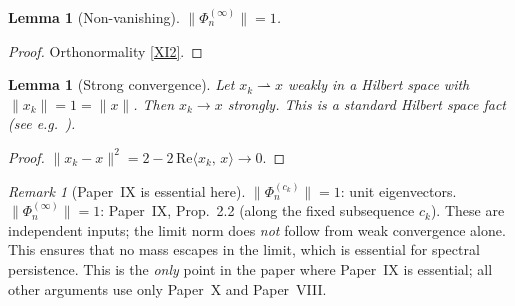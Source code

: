 \documentclass[12pt,a4paper]{amsart}
\newtheorem{lemma}[theorem]{Lemma}
\theoremstyle{definition}
\theoremstyle{remark}
\newtheorem{remark}[theorem]{Remark}
\newcommand{\ip}[2]{\langle #1,\, #2\rangle}
\begin{document}
\begin{lemma}[Non-vanishing]
\label{lem:nonvanish-limit}
$\|\Phi_n^{(\infty)}\|=1$.
\end{lemma}
\begin{proof}Orthonormality \eqref{XI2}.\end{proof}

\begin{lemma}[Strong convergence]
\label{lem:strong-conv}
Let $x_k\rightharpoonup x$ weakly in a Hilbert
space with $\|x_k\|=1=\|x\|$.
Then $x_k\to x$ strongly.
This is a standard Hilbert space fact
(see e.g.\ \cite[Ch.~II]{ReedSimon1975}).
\end{lemma}
\begin{proof}
$\|x_k-x\|^2=2-2\,\mathrm{Re}\ip{x_k}{x}\to 0$.
\end{proof}

\begin{remark}[Paper~IX is essential here]
\label{rem:norm-essential}
$\|\Phi_n^{(c_k)}\|=1$: unit eigenvectors.
$\|\Phi_n^{(\infty)}\|=1$: Paper~IX, Prop.~2.2
(along the fixed subsequence $c_k$).
These are independent inputs;
the limit norm does \emph{not} follow from
weak convergence alone.
This ensures that no mass escapes in the limit,
which is essential for spectral persistence.
This is the \emph{only} point in the paper
where Paper~IX is essential;
all other arguments use only Paper~X and
Paper~VIII.
\end{remark}
\end{document}
